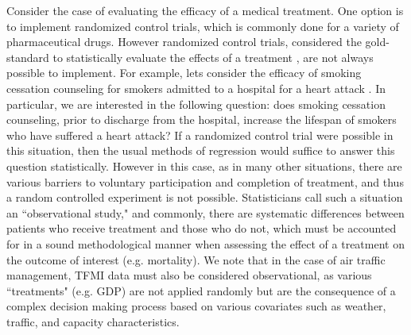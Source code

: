 \documentclass[11pt]{scrartcl}
\begin{document}
Consider the case of evaluating the efficacy of a medical treatment.  One option is to implement randomized control trials, which is commonly done for a variety of pharmaceutical drugs.  However randomized control trials, considered the gold-standard to statistically evaluate the effects of a treatment \cite{austin2011introduction}, are not always possible to implement.  For example, lets consider the efficacy of smoking cessation counseling for smokers admitted to a hospital for a heart attack \cite{austin2011tutorial}.  In particular, we are interested in the following question: does smoking cessation counseling, prior to discharge from the hospital, increase the lifespan of smokers who have suffered a heart attack?  If a randomized control trial were possible in this situation, then the usual methods of regression would suffice to answer this question statistically.  However in this case, as in many other situations, there are various barriers to voluntary participation and completion of treatment, and thus a random controlled experiment is not possible.  Statisticians call such a situation an ``observational study," and commonly, there are systematic differences between patients who receive treatment and those who do not, which must be accounted for in a sound methodological manner when assessing the effect of a treatment on the outcome of interest (e.g. mortality).  We note that in the case of air traffic management, TFMI data must also be considered observational, as various ``treatments" (e.g. GDP) are not applied randomly but are the consequence of a complex decision making process based on various covariates such as weather, traffic, and capacity characteristics.  
\end{document}
